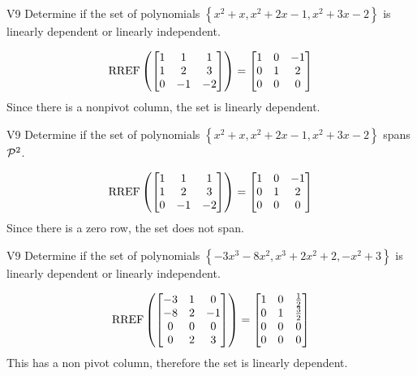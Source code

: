 \begin{problem}{V9}
Determine if the set of polynomials  \(\left\{x^2+x, x^2+2x-1, x^2+3x-2\right\}\) is  linearly dependent or linearly independent.
\end{problem}
\begin{solution}
\[\RREF\left( \begin{bmatrix} 1 &  1 & 1 \\ 1  & 2 & 3 \\ 0  & -1 & -2 \end{bmatrix} \right) = \begin{bmatrix} 1 &  0 & -1 \\ 0  & 1 & 2 \\ 0& 0 & 0  \end{bmatrix}\]
Since there is a nonpivot column, the set is linearly dependent.
\end{solution}

\begin{problem}{V9}
Determine if the set of polynomials  \(\left\{x^2+x, x^2+2x-1, x^2+3x-2\right\}\) spans \(\P^2\).
\end{problem}
\begin{solution}
\[\RREF\left( \begin{bmatrix} 1 &  1 & 1 \\ 1  & 2 & 3 \\ 0  & -1 & -2 \end{bmatrix} \right) = \begin{bmatrix} 1 &  0 & -1 \\ 0  & 1 & 2 \\ 0& 0 & 0  \end{bmatrix}\]
Since there is a zero row, the set does not span.
\end{solution}

\begin{problem}{V9}
Determine if the set of polynomials \(\left\{ -3x^3-8x^2, x^3+2x^2+2, -x^2+3\right\}\) is  linearly dependent or linearly independent.
\end{problem}
\begin{solution}
\[\RREF\left( \begin{bmatrix}-3 & 1 & 0 \\ -8 & 2 & -1 \\ 0 & 0 & 0 \\ 0 & 2 & 3 \end{bmatrix}\right) = \begin{bmatrix} 1 & 0 & \frac{1}{2} \\ 0 & 1 & \frac{3}{2} \\ 0 & 0 & 0 \\ 0 & 0 & 0 \end{bmatrix}\]
This has a non pivot column, therefore the set is linearly dependent.
\end{solution}

